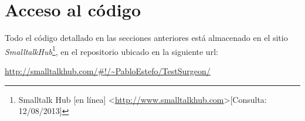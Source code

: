 \section{Acceso al código}
\par Todo el código detallado en las secciones anteriores está almacenado en el sitio \emph{SmalltalkHub}\footnote{Smalltalk Hub [en línea] \textless\url{http://www.smalltalkhub.com}\textgreater [Consulta: 12/08/2013] }, en el repositorio ubicado en la siguiente url: 
\begin{center}
\url{http://smalltalkhub.com/\#!/~PabloEstefo/TestSurgeon/}
\end{center}
